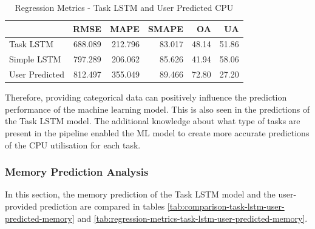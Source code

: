  

      \begin{table}
        \centering
        \caption{Regression Metrics - Task LSTM and User Predicted CPU}
        \label{tab:regression-metrics-task-lstm-user-predicted-cpu}
        \begin{tabular}{|l|rrrrr|}
          \toprule
          {} &     RMSE &     MAPE &   SMAPE &     OA &     UA \\
          \midrule
          Task LSTM   &  688.089 &  212.796 &  83.017 &  48.14 &  51.86 \\
          Simple LSTM &  797.289 &  206.062 &  85.626 &  41.94 &  58.06 \\
          User Predicted &  812.497 &  355.049 &  89.466 &  72.80 &  27.20 \\
          \bottomrule
        \end{tabular}
      \end{table}

      Therefore, providing categorical data can positively influence the prediction performance of the machine learning model. This is also seen in the predictions of the Task LSTM model. The additional knowledge about what type of tasks are present in the pipeline enabled the ML model to create more accurate predictions of the CPU utilisation for each task.

    \subsubsection{Memory Prediction Analysis}
    \label{sec:mem-prediction-analysis-task-knowledge-lstm-evaluation}

      In this section, the memory prediction of the Task LSTM model and the user-provided prediction are compared in tables \ref{tab:comparison-task-lstm-user-predicted-memory} and \ref{tab:regression-metrics-task-lstm-user-predicted-memory}.

